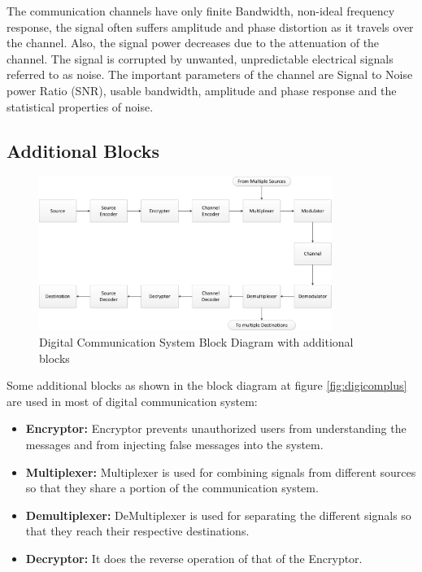 The communication channels have only finite Bandwidth, non-ideal frequency
response, the signal often suffers amplitude and phase distortion as it travels
over the channel. Also, the signal power decreases due to the attenuation of the
channel. The signal is corrupted by unwanted, unpredictable electrical signals
referred to as noise. The important parameters of the channel are Signal to
Noise power Ratio (SNR), usable bandwidth, amplitude and phase response and the
statistical properties of noise.

\subsection{Additional Blocks}
\begin{figure}[htbp]
    \centering
    \includegraphics[width=0.85\textwidth]{./figures/digicom_plus}
    \caption{ Digital Communication System Block Diagram with additional blocks
    \label{fig:digcomplus}}
\end{figure}

Some additional blocks as shown in the block diagram  at figure \ref{fig:digicomplus}
are used in most of digital communication system:

\begin{itemize}

  \item \textbf{Encryptor:} Encryptor prevents unauthorized users from
understanding the messages and from injecting false messages into the system.

  \item \textbf{Multiplexer:} Multiplexer is used for combining signals from
different sources so that they share a portion of the communication system.

  \item \textbf{Demultiplexer:} DeMultiplexer is used for separating the different
signals so that they reach their respective destinations.

  \item \textbf{Decryptor:} It does the reverse operation of that of the Encryptor.

\end{itemize}

